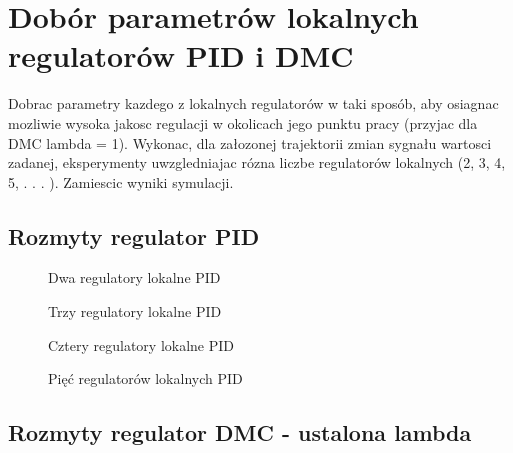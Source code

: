 \section{Dobór parametrów lokalnych regulatorów PID i DMC}
\label{projekt:zad6}

Dobrac parametry kazdego z lokalnych regulatorów w taki sposób, aby osiagnac mozliwie
wysoka jakosc regulacji w okolicach jego punktu pracy (przyjac dla DMC lambda = 1).
Wykonac, dla załozonej trajektorii zmian sygnału wartosci zadanej, eksperymenty
uwzgledniajac rózna liczbe regulatorów lokalnych (2, 3, 4, 5, . . . ). Zamiescic wyniki
symulacji.



\subsection{Rozmyty regulator PID}
\label{projekt:zad6:PID}

\begin{figure}[H] 
   \centering
   
   \caption{Dwa regulatory lokalne PID}
   \label{projekt:zad6:PID:2:figure}
\end{figure}

\begin{figure}[H] 
   \centering
   
   \caption{Trzy regulatory lokalne PID}
   \label{projekt:zad6:PID:3:figure}
\end{figure}

\begin{figure}[H] 
   \centering
   
   \caption{Cztery regulatory lokalne PID}
   \label{projekt:zad6:PID:4:figure}
\end{figure}

\begin{figure}[H] 
   \centering
   
   \caption{Pięć regulatorów lokalnych PID}
   \label{projekt:zad6:PID:5:figure}
\end{figure}



\newpage

\subsection{Rozmyty regulator DMC - ustalona lambda}
\label{projekt:zad6:DMC}



\newpage
